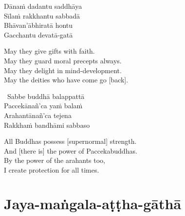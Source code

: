 \begin{pali-hang-continued}
  Dānaṁ dadantu saddhāya\\
  Sīlaṁ rakkhantu sabbadā\\
  Bhāvan'ābhiratā hontu\\
  Gacchantu devatā-gatā
\end{pali-hang-continued}

\begin{english-verses}
  May they give gifts with faith.\\
  May they guard moral precepts always.\\
  May they delight in mind-development.\\
  May the deities who have come go [back].
\end{english-verses}

\begin{leader-only}
\end{leader-only}

\vspace{-0.99em}

\begin{pali-hang-continued}
  \anglebracketleft\ \hspace{-0.5mm}Sabbe buddhā balappattā \hspace{-0.5mm}\anglebracketright\ \\
  Paccekānañ'ca yaṁ balaṁ\\
  Arahantānañ'ca tejena\\
  Rakkhaṁ bandhāmi sabbaso
\end{pali-hang-continued}

\begin{english-verses}
  All Buddhas possess [supernormal] strength.\\
  And [there is] the power of Paccekabuddhas.\\
  By the power of the arahants too,\\
  I create protection for all times.
\end{english-verses}

\suttaRef{[MJG]}

\section{Jaya-maṅgala-aṭṭha-gāthā}
\label{jaya-mangala-attha-gatha}

